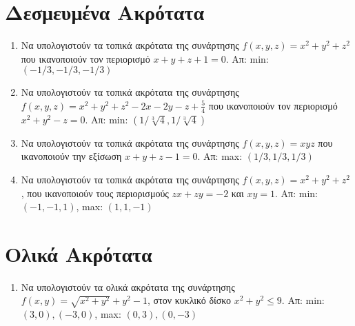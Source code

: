 \section*{Δεσμευμένα Ακρότατα}

\begin{enumerate}
  \item Να υπολογιστούν τα τοπικά ακρότατα της συνάρτησης $ f(x,y,z) = x^{2}+y^{2}+z^{2}
    $ που ικανοποιούν τον περιορισμό $ x+y+z+1=0 $.
    \hfill Απ: min: $ (-1/3,-1/3,-1/3) $ 

  \item Να υπολογιστούν τα τοπικά ακρότατα της συνάρτησης 
    $ f(x,y,z) = x^{2}+y^{2}+z^{2}-2x-2y-z+ \frac{5}{4} $ που ικανοποιούν τον 
    περιορισμό $ x^{2}+y^{2}-z=0  $.
    \hfill Απ: min: $ (1/ \sqrt[3]{4} , 1/ \sqrt[3]{4}) $ 

  \item Να υπολογιστούν τα τοπικά ακρότατα της συνάρτησης 
    $f(x,y,z)=xyz$ που ικανοποιούν την εξίσωση $x+y+z-1=0$.  
    \hfill Απ: max: $ (1/3,1/3,1/3) $ 

  \item Να υπολογιστούν τα τοπικά ακρότατα της συνάρτησης 
    $ f(x,y,z) = x^{2}+y^{2}+z^{2} $, που ικανοποιούν τους περιορισμούς 
    $ zx+zy=-2 $ και $ xy=1 $.
    \hfill Απ: min: $ (-1,-1,1) $, max: $ (1,1,-1) $ 
\end{enumerate}


\section*{Ολικά Ακρότατα}

\begin{enumerate}
  \item Να υπολογιστούν τα ολικά ακρότατα της συνάρτησης $ f(x,y) = \sqrt{x^{2}+y^{2}} +
    y^{2}-1 $, στον κυκλικό δίσκο $ x^{2}+y^{2} \leq 9 $. 
    \hfill Απ: min: $ (3,0), (-3,0) $, max: $ (0,3), (0,-3) $ 
\end{enumerate}


